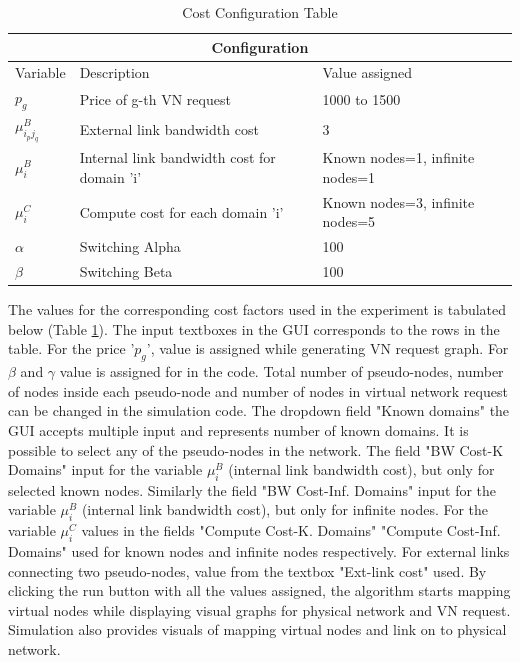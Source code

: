 \documentclass[article,dr=phil,type=msc ,colorback,accentcolor=tud4b]{tudthesis}
\begin{document}
\begin{table}[h]
	\centering
	\caption{Cost Configuration Table}
	\label{cost_table}
	\begin{tabular}{ |p{2cm}||p{5cm}|p{3cm}|} 
		\hline
		\multicolumn{3}{|c|}{Configuration} \\[2ex]
		\hline
		Variable& Description &Value assigned\\[2ex]
		\hline
		$p_{g}$   & Price of g-th VN request & 1000 to 1500 \\[3ex]
		$\mu_{i_{p}j_{q}}^{B}$ &   External link bandwidth cost  & 3   \\[3ex]
		$\mu_{i}^{B}$ & Internal link bandwidth cost for domain 'i' & Known nodes=1, infinite nodes=1\\[3ex]
		$\mu^{C}_{i}$    & Compute cost for each domain 'i' &  Known nodes=3, infinite nodes=5\\[3ex]
		$\alpha$ &   Switching Alpha  & 100\\[3ex]
		$\beta$ &   Switching Beta  & 100\\[3ex]
		\hline
	\end{tabular}
\end{table}
The values for the corresponding cost factors used in the experiment is tabulated below (Table \ref{cost_table}). The input textboxes in the GUI corresponds to the rows in the table. For the price '$p_{g}$', value is assigned while generating VN request graph. For $\beta$ and $\gamma$ value is assigned for in the code. Total number of pseudo-nodes, number of nodes inside each pseudo-node and number of nodes in virtual network request can be changed in the simulation code. The dropdown field "Known domains"  the GUI accepts multiple input and represents number of known domains. It is possible to select any of the pseudo-nodes in the network. The field "BW Cost-K Domains"  input for the variable $\mu_{i}^{B}$ (internal link bandwidth cost), but only for selected known nodes. Similarly the field "BW Cost-Inf. Domains"  input for the variable $\mu_{i}^{B}$ (internal link bandwidth cost), but only for infinite nodes. For the variable $\mu_{i}^{C}$ values in the fields "Compute Cost-K. Domains"   "Compute Cost-Inf. Domains"  used for known nodes and infinite nodes respectively. For external links connecting two pseudo-nodes, value from the textbox "Ext-link cost"  used. By clicking the run button with all the values assigned, the algorithm starts mapping virtual nodes while displaying visual graphs for physical network and VN request. Simulation also provides visuals of mapping virtual nodes and link on to physical network.\newline
\end{document}
